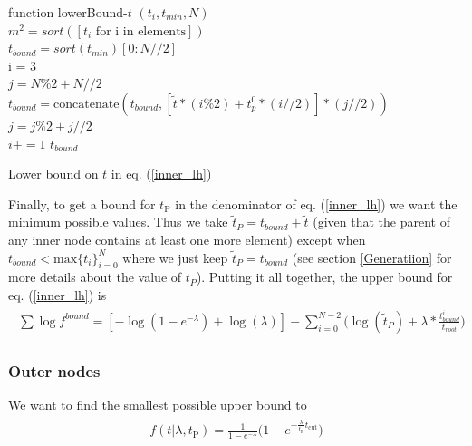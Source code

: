 \documentclass[12pt]{article}
\newcommand{\bea}{\begin{eqnarray}\begin{aligned}}
\newcommand{\eea}{\end{aligned}\end{eqnarray}}
\begin{document}
\begin{algorithm}

    function lowerBound-$t$ $(t_i, t_{min}, N)$\\
    \Indp
    $m^2= sort([t_i \text{ for i in elements}])$\\
    $t_{bound} = sort(t_{min})[0:N // 2]$\\
    i = 3\\
    $j = N \% 2 + N // 2$\\

         {  
        $t_{bound} = \text{concatenate}(t_{bound}, [\tilde{t} *(i\%2)+ t_p^0*(i//2)] * (j// 2))$\\
        $j =  j \% 2 + j // 2 $\\
        $i += 1$
        }
    \Return $t_{bound}$
    \caption{Lower bound on $t$ in eq. (\ref{inner_lh})}
\end{algorithm}


Finally, to get a bound for $t_{\text{P}}$ in the denominator of eq. (\ref{inner_lh}) we want the minimum possible values. Thus we take $\tilde{t}_P = t_{bound}+ \tilde{t}$ (given that the parent of any inner node contains at least one more element) except when $t_{bound} < \text{max}\{t_i\}_{i=0}^N$ where we just keep $\tilde{t}_P =t_{bound}$ (see section \ref{Generatiion} for more details about the value of $t_P$).
Putting it all together, the upper bound for eq.  (\ref{inner_lh}) is
\bea
\sum \log f^{bound} = [-\log(1 - e^{- \lambda}) + \log(\lambda)] - \sum_{i=0}^{N-2} \bigg(\log(\tilde{t}_P ) + \lambda * \frac{t_{bound}^i }{ t_{root}} \bigg)
\eea


\subsubsection{ Outer nodes}
We want to find the smallest possible upper bound to 
\bea\label{outer_lh}
 f(t | \lambda, t_{\text{P}})=\frac{1}{1-e^{- \lambda}} \bigg(1-e^{- \frac{\lambda}{ t_{\text{P}}} t_{\text{cut}}}\bigg) 
\eea
\end{document}
